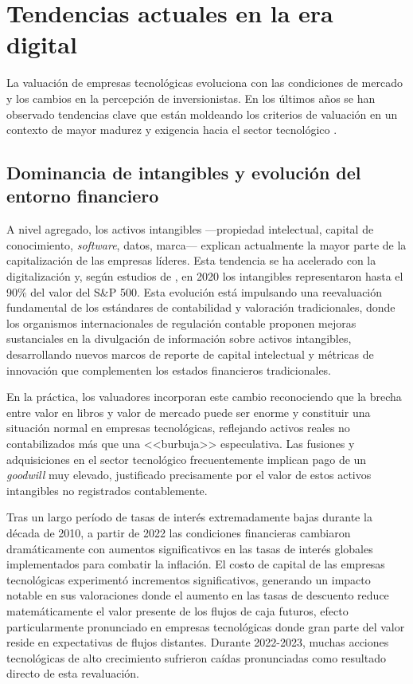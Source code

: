 \section{Tendencias actuales en la era digital}

La valuación de empresas tecnológicas evoluciona con las condiciones de mercado y los cambios en la percepción de inversionistas. En los últimos años se han observado tendencias clave que están moldeando los criterios de valuación en un contexto de mayor madurez y exigencia hacia el sector tecnológico \citep{baker2024,bdo2023}.

\subsection{Dominancia de intangibles y evolución del entorno financiero}

A nivel agregado, los activos intangibles ---propiedad intelectual, capital de conocimiento, \emph{software}, datos, marca--- explican actualmente la mayor parte de la capitalización de las empresas líderes. Esta tendencia se ha acelerado con la digitalización y, según estudios de \cite{oceantomo2020}, en 2020 los intangibles representaron hasta el 90\% del valor del S\&P 500. Esta evolución está impulsando una reevaluación fundamental de los estándares de contabilidad y valoración tradicionales, donde los organismos internacionales de regulación contable proponen mejoras sustanciales en la divulgación de información sobre activos intangibles, desarrollando nuevos marcos de reporte de capital intelectual y métricas de innovación que complementen los estados financieros tradicionales.

En la práctica, los valuadores incorporan este cambio reconociendo que la brecha entre valor en libros y valor de mercado puede ser enorme y constituir una situación normal en empresas tecnológicas, reflejando activos reales no contabilizados más que una <<burbuja>> especulativa. Las fusiones y adquisiciones en el sector tecnológico frecuentemente implican pago de un \emph{goodwill} muy elevado, justificado precisamente por el valor de estos activos intangibles no registrados contablemente.

Tras un largo período de tasas de interés extremadamente bajas durante la década de 2010, a partir de 2022 las condiciones financieras cambiaron dramáticamente con aumentos significativos en las tasas de interés globales implementados para combatir la inflación. El costo de capital de las empresas tecnológicas experimentó incrementos significativos, generando un impacto notable en sus valoraciones donde el aumento en las tasas de descuento reduce matemáticamente el valor presente de los flujos de caja futuros, efecto particularmente pronunciado en empresas tecnológicas donde gran parte del valor reside en expectativas de flujos distantes. Durante 2022-2023, muchas acciones tecnológicas de alto crecimiento sufrieron caídas pronunciadas como resultado directo de esta revaluación.

